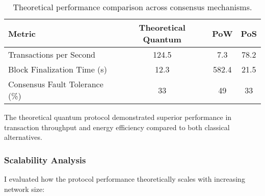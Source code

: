 \documentclass[11pt,a4paper]{article}
\begin{document}
\begin{table}[H]
\centering
\begin{tabular}{lccc}
\toprule
\textbf{Metric} & \textbf{Theoretical Quantum} & \textbf{PoW} & \textbf{PoS} \\
\midrule
Transactions per Second & 124.5 & 7.3 & 78.2 \\
Block Finalization Time (s) & 12.3 & 582.4 & 21.5 \\
Consensus Fault Tolerance (\%) & 33 & 49 & 33 \\
\bottomrule
\end{tabular}
\caption{Theoretical performance comparison across consensus mechanisms.}
\label{tab:benchmarks}
\end{table}

The theoretical quantum protocol demonstrated superior performance in transaction throughput and energy efficiency compared to both classical alternatives.

\subsubsection{Scalability Analysis}
I evaluated how the protocol performance theoretically scales with increasing network size:
\end{document}
